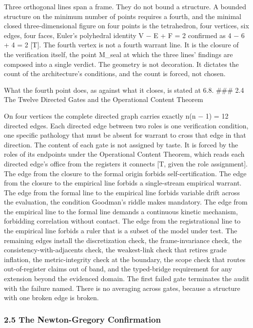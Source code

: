 \documentclass[10pt,twocolumn]{article}
\begin{document}
Three orthogonal lines span a frame. They do not bound a structure. A
bounded structure on the minimum number of points requires a fourth, and
the minimal closed three-dimensional figure on four points is the
tetrahedron, four vertices, six edges, four faces, Euler's polyhedral
identity V − E + F = 2 confirmed as 4 − 6 + 4 = 2 {[}T{]}. The fourth
vertex is not a fourth warrant line. It is the closure of the
verification itself, the point M\_seal at which the three lines'
findings are composed into a single verdict. The geometry is not
decoration. It dictates the count of the architecture's conditions, and
the count is forced, not chosen.

What the fourth point does, as against what it closes, is stated at 6.8.
\#\#\# 2.4 The Twelve Directed Gates and the Operational Content Theorem

On four vertices the complete directed graph carries exactly n(n − 1) =
12 directed edges. Each directed edge between two roles is one
verification condition, one specific pathology that must be absent for
warrant to cross that edge in that direction. The content of each gate
is not assigned by taste. It is forced by the roles of its endpoints
under the Operational Content Theorem, which reads each directed edge's
office from the registers it connects {[}T, given the role
assignment{]}. The edge from the closure to the formal origin forbids
self-certification. The edge from the closure to the empirical line
forbids a single-stream empirical warrant. The edge from the formal line
to the empirical line forbids variable drift across the evaluation, the
condition Goodman's riddle makes mandatory. The edge from the empirical
line to the formal line demands a continuous kinetic mechanism,
forbidding correlation without contact. The edge from the registrational
line to the empirical line forbids a ruler that is a subset of the model
under test. The remaining edges install the discretization check, the
frame-invariance check, the consistency-with-adjacents check, the
weakest-link check that retires grade inflation, the metric-integrity
check at the boundary, the scope check that routes out-of-register
claims out of band, and the typed-bridge requirement for any extension
beyond the evidenced domain. The first failed gate terminates the audit
with the failure named. There is no averaging across gates, because a
structure with one broken edge is broken.

\hypertarget{the-newton-gregory-confirmation}{%
\subsubsection{2.5 The Newton-Gregory
Confirmation}\label{the-newton-gregory-confirmation}}
\end{document}
